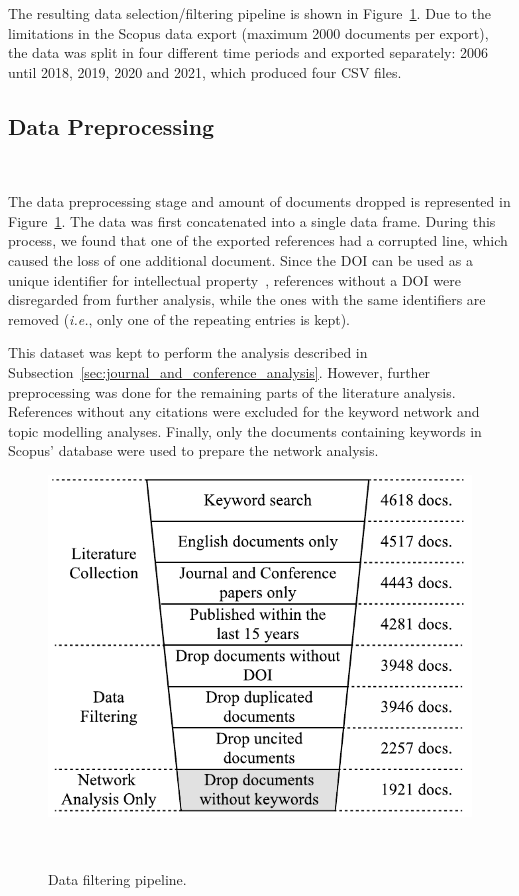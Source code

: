 \documentclass[parskip=full]{scrartcl}
\begin{document}
The resulting data selection/filtering pipeline is shown in
Figure~\ref{fig:data_filtering_pipeline}. Due to the limitations in the Scopus
data export (maximum 2000 documents per export), the data was split in four
different time periods and exported separately: 2006 until 2018, 2019, 2020
and 2021, which produced four CSV files.

\subsection{Data Preprocessing}~\label{sec:data_preprocessing}

The data preprocessing stage and amount of documents dropped is represented in
Figure~\ref{fig:data_filtering_pipeline}. The data was first concatenated into
a single data frame. During this process, we found that one of the exported
references had a corrupted line, which caused the loss of one additional
document.  Since the DOI can be used as a unique identifier for intellectual
property~\cite{Paskin1999}, references without a DOI were disregarded from
further analysis, while the ones with the same identifiers are removed
(\textit{i.e.}, only one of the repeating entries is kept).

This dataset was kept to perform the analysis described in
Subsection~\ref{sec:journal_and_conference_analysis}. However, further
preprocessing was done for the remaining parts of the literature analysis.
References without any citations were excluded for the keyword network and
topic modelling analyses. Finally, only the documents containing keywords in
Scopus' database were used to prepare the network analysis.

\begin{figure}[H]
	\centering
    \includegraphics[width=.55\linewidth]{../analysis/data_filtering_pipeline}
    \caption{Data filtering pipeline.
    }~\label{fig:data_filtering_pipeline}
\end{figure}
\end{document}
